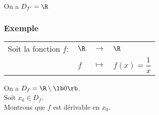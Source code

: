 On a $D_{f'} = \R$

\newpage

\subsubsection{Exemple }

\begin{tabular}{llll}
Soit la fonction $f :$ & $\R$ & $\longrightarrow$ & $\R$ \\
& $f$ & $\longmapsto$ & $f(x) = \dfrac{1}{x} $ \\
\end{tabular}

On a $D_f = \R \setminus \lb 0 \rb $. \\

Soit $x_0 \in D_f$. \\

Montrons que $f$ est dérivable en $x_0$. \\

